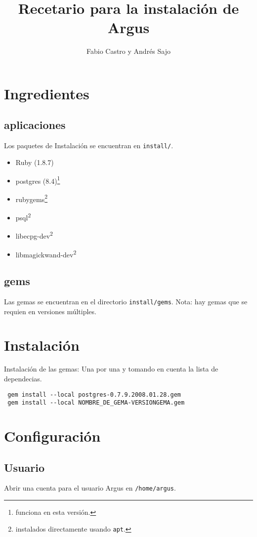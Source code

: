 \documentclass[spanish,10pt]{article}
\title{Recetario para la instalación de Argus}
\author{Fabio Castro y Andrés Sajo}
\begin{document}
\maketitle
\section{Ingredientes}
\subsection{aplicaciones}
Los paquetes de Instalación se encuentran en \texttt{install/}.
\begin{itemize}
\item[]  Ruby (1.8.7)
\item[] postgres (8.4)\footnote{funciona en esta versión.} 
\item[] rubygems\footnote[2]{instalados directamente usando \texttt{apt}.}
\item[] psql\textsuperscript{2}
\item[] libecpg-dev\textsuperscript{2}
\item[] libmagickwand-dev\textsuperscript{2}
\end{itemize}
\subsection{gems}
Las gemas se encuentran en el directorio \texttt{install/gems}. Nota: hay gemas que se requien en versiones múltiples.

\section{Instalación}
Instalación de las gemas: Una por una y tomando en cuenta la lista de dependecias.
\begin{verbatim}
 gem install --local postgres-0.7.9.2008.01.28.gem
 gem install --local NOMBRE_DE_GEMA-VERSIONGEMA.gem
\end{verbatim}

\section{Configuración}
\subsection{Usuario}
Abrir una cuenta para el usuario Argus en \texttt{/home/argus}.
\end{document}
